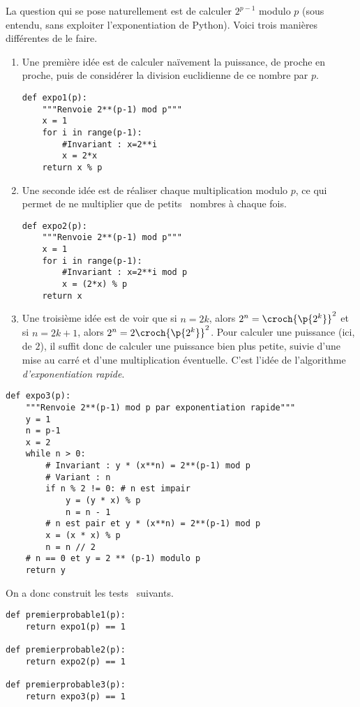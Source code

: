 La question qui se pose naturellement est de calculer $2^{p-1}$ modulo $p$ (sous entendu, sans exploiter l'exponentiation de Python). Voici trois manières différentes de le faire. 

\begin{enumerate}
  \item Une première idée est de calculer naïvement la puissance, de proche en proche, puis de considérer la division euclidienne de ce nombre par $p$.
\begin{lstlisting}
def expo1(p):
    """Renvoie 2**(p-1) mod p"""
    x = 1
    for i in range(p-1):
    	#Invariant : x=2**i
        x = 2*x
    return x % p
\end{lstlisting}
  \item Une seconde idée est de réaliser chaque multiplication modulo $p$, ce qui permet de ne multiplier que de \og petits \fg\ nombres à chaque fois. 
\begin{lstlisting}
def expo2(p):
    """Renvoie 2**(p-1) mod p"""
    x = 1
    for i in range(p-1):
    	#Invariant : x=2**i mod p
        x = (2*x) % p
    return x  
\end{lstlisting}
  \item Une troisième idée est de voir que si $n = 2k$, alors $2^n = \croch{\p{2^k}}^2$ et si $n = 2k+1$, alors $2^n = 2\croch{\p{2^k}}^2$. 
  Pour calculer une puissance (ici, de $2$), il suffit donc de calculer une puissance bien plus petite, suivie d'une mise au carré et d'une multiplication éventuelle. C'est l'idée de l'algorithme \emph{d'exponentiation rapide}.

\end{enumerate}
\begin{lstlisting}
def expo3(p):
    """Renvoie 2**(p-1) mod p par exponentiation rapide"""
    y = 1
    n = p-1
    x = 2
    while n > 0:
        # Invariant : y * (x**n) = 2**(p-1) mod p
        # Variant : n
        if n % 2 != 0: # n est impair
            y = (y * x) % p
            n = n - 1
        # n est pair et y * (x**n) = 2**(p-1) mod p
        x = (x * x) % p
        n = n // 2
    # n == 0 et y = 2 ** (p-1) modulo p
    return y
\end{lstlisting}


On a donc construit les \og tests \fg\ suivants.

\begin{lstlisting}
def premierprobable1(p):
    return expo1(p) == 1

def premierprobable2(p):
    return expo2(p) == 1

def premierprobable3(p):
    return expo3(p) == 1
\end{lstlisting}

